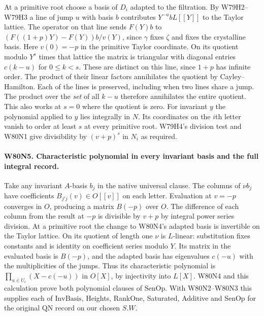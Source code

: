 At a primitive root choose a basis of $D_i$ adapted to the filtration.
By W79H2--W79H3 a line of jump $u$ with basis $b$ contributes
$Y^{-u}bL[[Y]]$ to the Taylor lattice. The operator on that line
sends $F(Y)b$ to $(F((1+p)Y)-F(Y))b/v(Y)$, since $\gamma$ fixes
$\zeta$ and fixes the crystalline basis. Here $v(0)=-p$ in the
primitive Taylor coordinate. On its quotient modulo $Y^s$ times
that lattice the matrix is triangular with diagonal entries
$c(k-u)$ for $0\le k<s$. These are distinct on this line, since
$1+p$ has infinite order. The product of their linear factors
annihilates the quotient by Cayley--Hamilton. Each of the lines is
preserved, including when two lines share a jump. The product over
the \emph{set} of all $k-u$ therefore annihilates the entire quotient.
This also works at $s=0$ where the quotient is zero. For invariant
$y$ the polynomial applied to $y$ lies integrally in $N$. Its
coordinates on the $i$th letter vanish to order at least $s$ at
every primitive root. W79H4's division test and W80N1 give divisibility
by $(v+p)^s$ in $N_i$ as required.

\paragraph{W80N5. Characteristic polynomial in every invariant basis and the full integral record.}
Take any invariant $A$-basis $b_j$ in the native universal clause.
The columns of $\nu b_j$ have coefficients $B_{j'j}(v)\in O[[v]]$
on each letter. Evaluation at $v=-p$ converges in $O$, producing a
matrix $B(-p)$ over $O$. The difference of each column from the
result at $-p$ is divisible by $v+p$ by integral power series
division. At a primitive root the change to W80N4's adapted basis
is invertible on the Taylor lattice. On its quotient of length one
$\nu$ is $L$-linear: substitution fixes constants and is identity
on coefficient series modulo $Y$. Its matrix in the evaluated
basis is $B(-p)$, and the adapted basis has eigenvalues $c(-u)$
with the multiplicities of the jumps. Thus its characteristic
polynomial is $\prod_{u\in U_i}(X-c(-u))$ in $O[X]$, by injectivity
into $L[X]$. W80N4 and this calculation prove both polynomial clauses
of $\mathrm{SenOp}$. With W80N2--W80N3 this supplies each of
$\mathrm{InvBasis}$, Heights, RankOne, Saturated, Additive and SenOp
for the original $\mathrm{QN}$ record on our chosen $S.W$.

